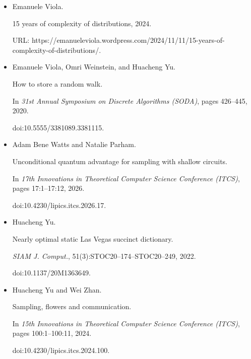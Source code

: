 \documentclass[10pt,a4paper]{article}
\begin{document}
\begin{itemize}
doi:10.4230/lipics.ccc.2023.26.





\item[] 
[46]

Emanuele Viola.


15 years of complexity of distributions, 2024.


URL:
https://emanueleviola.wordpress.com/2024/11/11/15-years-of-complexity-of-distributions/.





\item[] 
[47]

Emanuele Viola, Omri Weinstein, and Huacheng Yu.


How to store a random walk.


In \emph{31st Annual Symposium on Discrete Algorithms (SODA)}, pages
426–445, 2020.


doi:10.5555/3381089.3381115.





\item[] 
[48]

Adam Bene Watts and Natalie Parham.


Unconditional quantum advantage for sampling with shallow circuits.


In \emph{17th Innovations in Theoretical Computer Science Conference
(ITCS)}, pages 17:1–17:12, 2026.


doi:10.4230/lipics.itcs.2026.17.





\item[] 
[49]

Huacheng Yu.


Nearly optimal static Las Vegas succinct dictionary.


\emph{SIAM J. Comput.}, 51(3):STOC20–174–STOC20–249, 2022.


doi:10.1137/20M1363649.





\item[] 
[50]

Huacheng Yu and Wei Zhan.


Sampling, flowers and communication.


In \emph{15th Innovations in Theoretical Computer Science Conference
(ITCS)}, pages 100:1–100:11, 2024.


doi:10.4230/lipics.itcs.2024.100.





\end{itemize}
\end{document}
